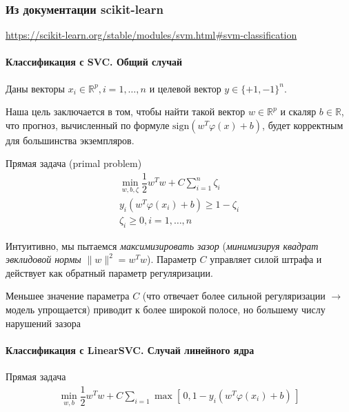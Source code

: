 \documentclass[%
	11pt,
	a4paper,
	utf8,
		]{article}
\begin{document}
\subsubsection{Из документации scikit-learn}

\url{https://scikit-learn.org/stable/modules/svm.html#svm-classification}

\paragraph{Классификация с SVC. Общий случай}

Даны векторы $ x_i \in \mathbb{R}^p, i = 1, \ldots, n $ и целевой вектор $ y \in \{ +1, -1 \}^n $.

Наша цель заключается в том, чтобы найти такой вектор $ w \in \mathbb{R}^p $ и скаляр $ b \in \mathbb{R} $, что прогноз, вычисленный по формуле $ \text{sign}(w^T \varphi(x) + b) $, будет корректным для большинства экземпляров.

Прямая задача (primal problem)
\begin{align*}
	\min_{w, b, \zeta} \dfrac{1}{2} w^T w + C \sum_{i=1}^{n} \zeta_i \\
	y_i (w^T \varphi(x_i) + b) \geqslant 1 - \zeta_i \\
	\zeta_i \geqslant 0, i = 1, \ldots, n
\end{align*}

Интуитивно, мы пытаемся \emph{максимизировать зазор} (\emph{минимизируя квадрат эвклидовой нормы} $ \| w \|^2 = w^T w $). Параметр $ C $ управляет силой штрафа и действует как обратный параметр регуляризации.


Меньшее значение параметра $ C $ (что отвечает более сильной регуляризации $ \rightarrow $ модель упрощается) приводит к более широкой полосе, но б{\itshape о}льшему числу нарушений зазора \cite[]{geron:hands_on_ml}

\paragraph{Классификация с LinearSVC. Случай линейного ядра}

Прямая задача
\begin{align*}
	\min_{w, b} \dfrac{1}{2} w^T w + C \sum_{i=1} \max[ \, 0, 1 - y_i (w^T \varphi(x_i) + b) \, ]
\end{align*}
\end{document}
